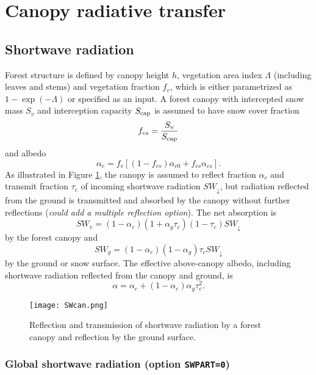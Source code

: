 \documentclass{article}
\begin{document}
\section{Canopy radiative transfer}

\subsection{Shortwave radiation}

Forest structure is defined by canopy height $h$, vegetation area index $\Lambda$ (including leaves and stems) and vegetation fraction $f_v$, which is either parametrized as $1-\exp(-\Lambda)$ or specified as an input. A forest canopy with intercepted snow mass $S_v$ and interception capacity $S_{\rm cap}$ is assumed to have snow cover fraction 
\begin{equation}
f_{cs} = \frac{S_v}{S_{\rm cap}}
\end{equation}
and albedo
\begin{equation}
\alpha_c = f_v[(1 - f_{cs})\alpha_{c0} + f_{cs}\alpha_{cs}].
\end{equation}
As illustrated in Figure \ref{fig:SWcan}, the canopy is assumed to reflect fraction $\alpha_c$ and transmit fraction $\tau_c$ of incoming shortwave radiation $SW_\downarrow$, but radiation reflected from the ground is transmitted and absorbed by the canopy without further reflections ({\it could add a multiple reflection option}). The net absorption is
\begin{equation}
SW_v = (1 - \alpha_c)(1 + \alpha_g\tau_c) (1 - \tau_c)SW_\downarrow
\label{eq:SWv} 
\end{equation} 
by the forest canopy and
\begin{equation}
SW_g = (1 - \alpha_c)(1 - \alpha_g)\tau_c SW_\downarrow
\label{eq:SWg} 
\end{equation} 
by the ground or snow surface. The effective above-canopy albedo, including shortwave radiation reflected from the canopy and ground, is
\begin{equation}
\alpha = \alpha_c + (1 - \alpha_c)\alpha_g\tau_c^2.
\end{equation} 

\begin{figure}[t]
\texttt{[image: SWcan.png]}
\caption{Reflection and transmission of shortwave radiation by a forest canopy and reflection by the ground surface.}
\label{fig:SWcan}
\end{figure}

\subsubsection{Global shortwave radiation (option {\tt SWPART=0})}
\end{document}
